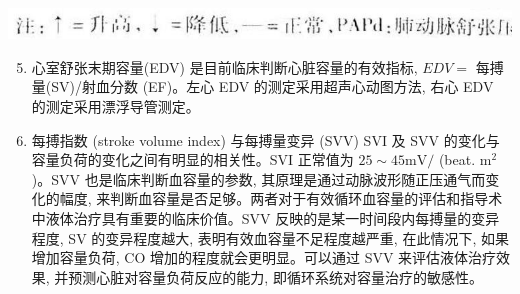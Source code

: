 \documentclass[10pt]{article}
\begin{document}
\begin{center}
\includegraphics[max width=\textwidth]{2024_07_09_002a177993bd97d1d6d7g-180(2)}
\end{center}

\begin{enumerate}
  \setcounter{enumi}{4}
  \item 心室舒张末期容量(EDV) 是目前临床判断心脏容量的有效指标, $E D V=$ 每搏量(SV)/射血分数 (EF)。左心 EDV 的测定采用超声心动图方法, 右心 EDV 的测定采用漂浮导管测定。

  \item 每搏指数 (stroke volume index) 与每搏量变异 (SVV) SVI 及 SVV 的变化与容量负荷的变化之间有明显的相关性。SVI 正常值为 $25 \sim 45 \mathrm{mV} /$ (beat. $\mathrm{m}^{2}$ )。SVV 也是临床判断血容量的参数, 其原理是通过动脉波形随正压通气而变化的幅度, 来判断血容量是否足够。两者对于有效循环血容量的评估和指导术中液体治疗具有重要的临床价值。SVV 反映的是某一时间段内每搏量的变异程度, SV 的变异程度越大, 表明有效血容量不足程度越严重, 在此情况下, 如果增加容量负荷, CO 增加的程度就会更明显。可以通过 SVV 来评估液体治疗效果, 并预测心脏对容量负荷反应的能力, 即循环系统对容量治疗的敏感性。

\end{enumerate}
\end{document}
